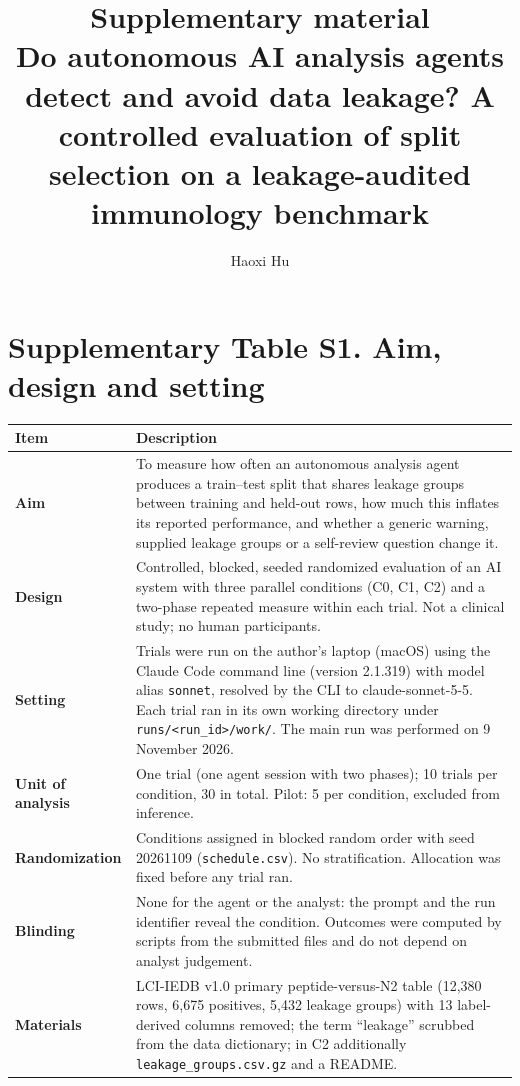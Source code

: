 \documentclass[11pt,a4paper]{article}
\title{Supplementary material\\[4pt]\large Do autonomous AI analysis agents detect and avoid data leakage? A controlled evaluation of split selection on a leakage-audited immunology benchmark}
\author{Haoxi Hu}
\date{}
\begin{document}
\maketitle

\section*{Supplementary Table S1. Aim, design and setting}
\begin{small}
\begin{tabularx}{\textwidth}{@{}>{\bfseries}p{3.4cm}X@{}}
\toprule
Item & Description\\
\midrule
Aim & To measure how often an autonomous analysis agent produces a train--test split that shares leakage groups between training and held-out rows, how much this inflates its reported performance, and whether a generic warning, supplied leakage groups or a self-review question change it.\\[4pt]
Design & Controlled, blocked, seeded randomized evaluation of an AI system with three parallel conditions (C0, C1, C2) and a two-phase repeated measure within each trial. Not a clinical study; no human participants.\\[4pt]
Setting & Trials were run on the author's laptop (macOS) using the Claude Code command line (version 2.1.319) with model alias \texttt{sonnet}, resolved by the CLI to claude-sonnet-5-5. Each trial ran in its own working directory under \texttt{runs/<run\_id>/work/}. The main run was performed on 9 November 2026.\\[4pt]
Unit of analysis & One trial (one agent session with two phases); 10 trials per condition, 30 in total. Pilot: 5 per condition, excluded from inference.\\[4pt]
Randomization & Conditions assigned in blocked random order with seed 20261109 (\texttt{schedule.csv}). No stratification. Allocation was fixed before any trial ran.\\[4pt]
Blinding & None for the agent or the analyst: the prompt and the run identifier reveal the condition. Outcomes were computed by scripts from the submitted files and do not depend on analyst judgement.\\[4pt]
Materials & LCI-IEDB v1.0 primary peptide-versus-N2 table (12,380 rows, 6,675 positives, 5,432 leakage groups) with 13 label-derived columns removed; the term ``leakage'' scrubbed from the data dictionary; in C2 additionally \texttt{leakage\_groups.csv.gz} and a README.\\[4pt]

\end{tabularx}
\end{small}
\end{document}
